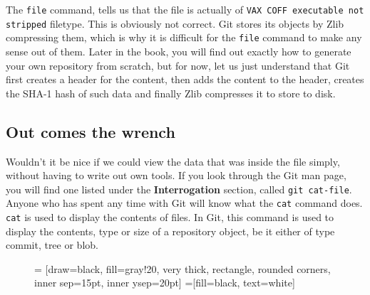 The \texttt{file} command, tells us that the file is actually of \texttt{VAX COFF executable not stripped} filetype.  This is obviously not correct.  Git stores its objects by Zlib compressing them, which is why it is difficult for the \texttt{file} command to make any sense out of them.  Later in the book, you will find out exactly how to generate your own repository from scratch, but for now, let us just understand that Git first creates a header for the content, then adds the content to the header, creates the SHA-1 hash of such data and finally Zlib compresses it to store to disk.

\subsection{Out comes the wrench}
Wouldn't it be nice if we could view the data that was inside the file simply, without having to write out own tools.  If you look through the Git man page, you will find one listed under the \textbf{Interrogation} section, called \texttt{git cat-file}.  Anyone who has spent any time with Git will know what the \texttt{cat} command does.  \texttt{cat} is used to display the contents of files.  In Git, this command is used to display the contents, type or size of a repository object, be it either of type commit, tree or blob.

\begin{figure}[hbt]
 = [draw=black, fill=gray!20, very thick, rectangle, rounded corners, inner sep=15pt, inner ysep=20pt]
 =[fill=black, text=white]
\end{figure}

